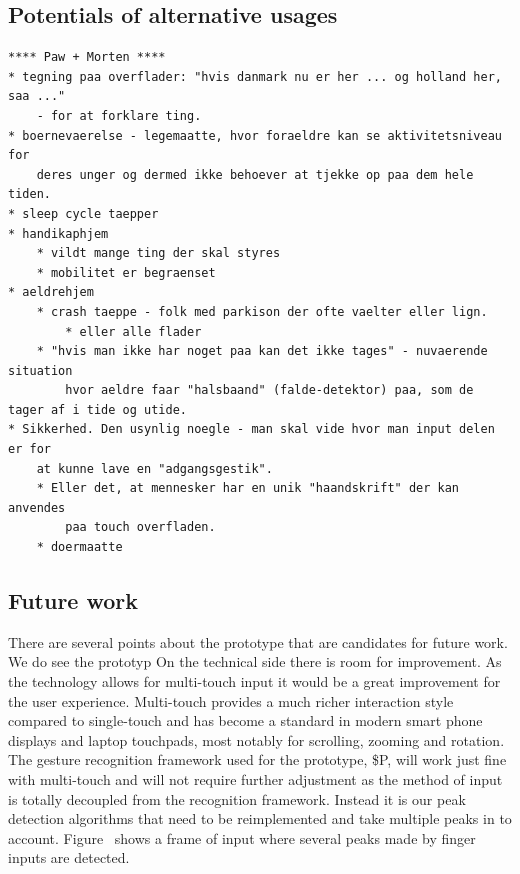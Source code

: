 \subsection{Potentials of alternative usages}

\begin{verbatim}
**** Paw + Morten ****
* tegning paa overflader: "hvis danmark nu er her ... og holland her, saa ..." 
	- for at forklare ting.
* boernevaerelse - legemaatte, hvor foraeldre kan se aktivitetsniveau for 
	deres unger og dermed ikke behoever at tjekke op paa dem hele tiden.
* sleep cycle taepper
* handikaphjem
	* vildt mange ting der skal styres
    * mobilitet er begraenset
* aeldrehjem
    * crash taeppe - folk med parkison der ofte vaelter eller lign.
        * eller alle flader
    * "hvis man ikke har noget paa kan det ikke tages" - nuvaerende situation 
		hvor aeldre faar "halsbaand" (falde-detektor) paa, som de tager af i tide og utide.
* Sikkerhed. Den usynlig noegle - man skal vide hvor man input delen er for 
	at kunne lave en "adgangsgestik".
    * Eller det, at mennesker har en unik "haandskrift" der kan anvendes 
		paa touch overfladen.
    * doermaatte
\end{verbatim}



\subsection{Future work}
\label{ch:textiletouch:futurework}

There are several points about the prototype that are candidates for future work.
We do see the prototyp
On the technical side there is room for improvement.
As the technology allows for multi-touch input it would be a great improvement for the user experience.
Multi-touch provides a much richer interaction style  compared to single-touch and has become a standard in modern smart phone displays and laptop touchpads, most notably for scrolling, zooming and rotation.
The gesture recognition framework used for the prototype, \$P, will work just fine with multi-touch and will not require further adjustment as the method of input is totally decoupled from the recognition framework. 
Instead it is our peak detection algorithms that need to be reimplemented and take multiple peaks in to account.
Figure~ shows a frame of input where several peaks made by finger inputs are detected. 

